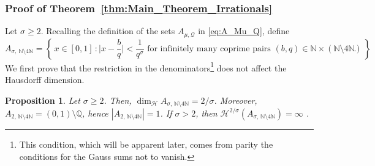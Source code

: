 \documentclass[11pt,reqno]{amsart}
\newtheorem{prop}[thm]{Proposition}
\theoremstyle{definition}
\begin{document}
\subsubsection{Proof of Theorem~\ref{thm:Main_Theorem_Irrationals}}
Let $\sigma \geq 2$. 
Recalling the definition of the sets $A_{\mu, \mathcal Q}$ in \eqref{eq:A_Mu_Q}, define 
\begin{equation}
A_{\sigma,  \, \mathbb N \setminus 4\mathbb N} 
= \left\{ \, x \in [0,1] \, : \Big| x - \frac{b}{q} \Big| < \frac{1}{ q^\sigma} \text{ for infinitely many coprime pairs } (b,q) \in \mathbb N \times (\mathbb N \setminus 4\mathbb N) \,   \right\}.
\end{equation}
We first prove that the restriction in the denominators\footnote{This condition, which will be apparent later, comes from parity the conditions for the Gauss sums not to vanish.} 
does not affect the Hausdorff dimension.   
\begin{prop}\label{thm:Dimension_X_Mu}
Let $\sigma \geq 2$. Then, $\operatorname{dim}_{\mathcal H} A_{\sigma,  \, \mathbb N \setminus 4\mathbb N}  = 2/\sigma$. 
Moreover, 
$A_{2,  \, \mathbb N \setminus 4\mathbb N} = (0,1) \setminus \mathbb Q$, hence $|A_{2,  \, \mathbb N \setminus 4\mathbb N} | = 1$. 
If $\sigma > 2$, then $\mathcal H^{2/\sigma}(A_{\sigma,  \, \mathbb N \setminus 4\mathbb N} ) = \infty$ . 
\end{prop}
\end{document}
